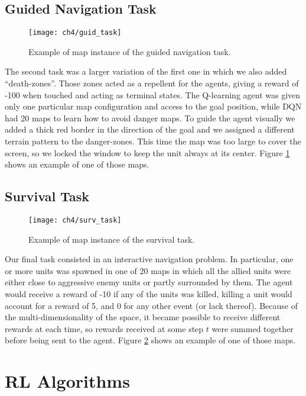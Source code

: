 \subsection{Guided Navigation Task}

\begin{figure}[h]
    \centering
    \texttt{[image: ch4/guid\_task]}
    \caption{Example of map instance of the guided navigation task.}
    \label{fig:guid_task}
\end{figure}

The second task was a larger variation of the first one in which we also added
``death-zones''. Those zones acted as a repellent for the agents, giving a
reward of -100 when touched and acting as terminal states. The Q-learning agent
was given only one particular map configuration and access to the goal position,
while DQN had 20 maps to learn how to avoid danger maps. To guide the agent
visually we added a thick red border in the direction of the goal and we
assigned a different terrain pattern to the danger-zones. This time the map was
too large to cover the screen, so we locked the window to keep the unit always
at its center. Figure \ref{fig:guid_task} shows an example of one of those maps.

\subsection{Survival Task}

\begin{figure}[h]
    \centering
    \texttt{[image: ch4/surv\_task]}
    \caption{Example of map instance of the survival task.}
    \label{fig:surv_task}
\end{figure}

Our final task consisted in an interactive navigation problem. In particular,
one or more units was spawned in one of 20 maps in which all the allied units
were either close to aggressive enemy units or partly surrounded by them.
The agent would receive a reward of -10 if any of the units was killed, killing
a unit would account for a reward of 5, and 0 for any other event (or lack
thereof). Because of the multi-dimensionality of the space, it became possible
to receive different rewards at each time, so rewards received at some step $t$
were summed together before being sent to the agent. Figure \ref{fig:surv_task}
shows an example of one of those maps.


\section{RL Algorithms}

